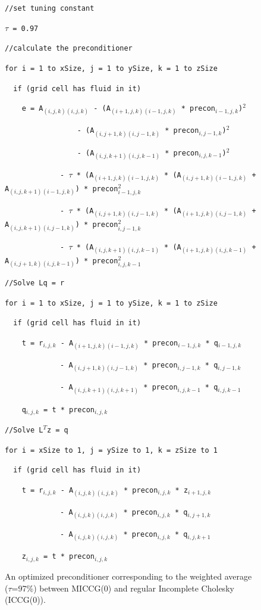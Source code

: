 \documentclass[12pt]{article}
\begin{document}
\begin{figure}[h]
\begin{framed}
\texttt{//set tuning constant}

\texttt{$\tau$ = 0.97}

\texttt{}

\texttt{//calculate the preconditioner}

\texttt{for i = 1 to xSize, j = 1 to ySize, k = 1 to zSize}

\texttt{~~if (grid cell has fluid in it)}

\texttt{~~~~e = A$_{(i,j,k)(i,j,k)}$ - (A$_{(i+1,j,k)(i-1,j,k)}$ * precon$_{i-1,j,k}$)$^2$}

\texttt{~~~~~~~~~~~~~~~~~- (A$_{(i,j+1,k)(i,j-1,k)}$ * precon$_{i,j-1,k}$)$^2$} 

\texttt{~~~~~~~~~~~~~~~~~- (A$_{(i,j,k+1)(i,j,k-1)}$ * precon$_{i,j,k-1}$)$^2$}

\texttt{~~~~~~~~~~~~~- $\tau$ * (A$_{(i+1,j,k)(i-1,j,k)}$ * (A$_{(i,j+1,k)(i-1,j,k)}$ + A$_{(i,j,k+1)(i-1,j,k)}$) * precon$_{i-1,j,k}^2$}

\texttt{~~~~~~~~~~~~~- $\tau$ * (A$_{(i,j+1,k)(i,j-1,k)}$ * (A$_{(i+1,j,k)(i,j-1,k)}$ + A$_{(i,j,k+1)(i,j-1,k)}$) * precon$_{i,j-1,k}^2$}

\texttt{~~~~~~~~~~~~~- $\tau$ * (A$_{(i,j,k+1)(i,j,k-1)}$ * (A$_{(i+1,j,k)(i,j,k-1)}$ + A$_{(i,j+1,k)(i,j,k-1)}$) * precon$_{i,j,k-1}^2$}

\texttt{}

\texttt{//Solve Lq = r}

\texttt{for i = 1 to xSize, j = 1 to ySize, k = 1 to zSize}

\texttt{~~if (grid cell has fluid in it)}

\texttt{~~~~t = r$_{i,j,k}$ - A$_{(i+1,j,k)(i-1,j,k)}$ * precon$_{i-1,j,k}$ * q$_{i-1,j,k}$}

\texttt{~~~~~~~~~~~~~- A$_{(i,j+1,k)(i,j-1,k)}$ * precon$_{i,j-1,k}$ * q$_{i,j-1,k}$}

\texttt{~~~~~~~~~~~~~- A$_{(i,j,k+1)(i,j,k+1)}$ * precon$_{i,j,k-1}$ * q$_{i,j,k-1}$}

\texttt{~~~~q$_{i,j,k}$ = t * precon$_{i,j,k}$}

\texttt{}

\texttt{//Solve L$^T$z = q}

\texttt{for i = xSize to 1, j = ySize to 1, k = zSize to 1}

\texttt{~~if (grid cell has fluid in it)}

\texttt{~~~~t = r$_{i,j,k}$ - A$_{(i,j,k)(i,j,k)}$ * precon$_{i,j,k}$ * z$_{i+1,j,k}$}

\texttt{~~~~~~~~~~~~~- A$_{(i,j,k)(i,j,k)}$ * precon$_{i,j,k}$ * q$_{i,j+1,k}$}

\texttt{~~~~~~~~~~~~~- A$_{(i,j,k)(i,j,k)}$ * precon$_{i,j,k}$ * q$_{i,j,k+1}$}

\texttt{~~~~z$_{i,j,k}$ = t * precon$_{i,j,k}$}

\end{framed}
\centering
\vspace*{-3mm}\caption{An optimized preconditioner corresponding to the weighted average ($\tau$=97\%) between MICCG(0) and regular Incomplete Cholesky (ICCG(0)).}
\label{fig:precond}
\end{figure}

\end{document}

